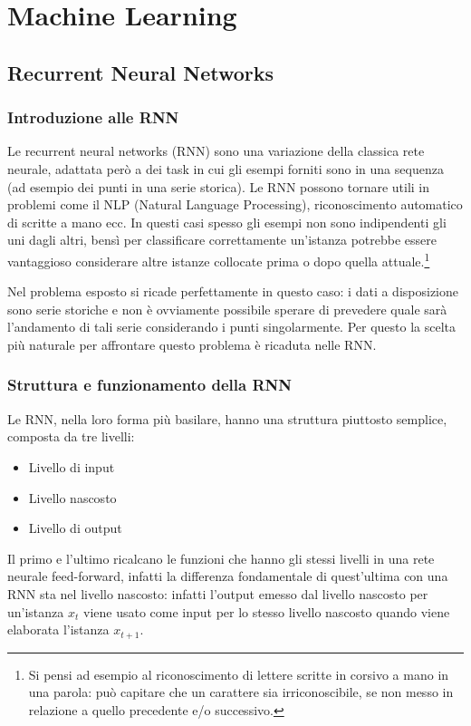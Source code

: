 \section{Machine Learning}

\subsection{Recurrent Neural Networks}

\subsubsection{Introduzione alle RNN}
Le recurrent neural networks (RNN) sono una variazione della classica rete neurale, adattata però a dei task in cui gli esempi forniti sono in una sequenza (ad esempio dei punti in una serie storica). Le RNN possono tornare utili in problemi come il NLP (Natural Language Processing), riconoscimento automatico di scritte a mano ecc. In questi casi spesso gli esempi non sono indipendenti gli uni dagli altri, bensì per classificare correttamente un'istanza potrebbe essere vantaggioso considerare altre istanze collocate prima o dopo quella attuale.\footnote{Si pensi ad esempio al riconoscimento di lettere scritte in corsivo a mano in una parola: può capitare che un carattere sia irriconoscibile, se non messo in relazione a quello precedente e/o successivo.}

Nel problema esposto si ricade perfettamente in questo caso: i dati a disposizione sono serie storiche e non è ovviamente possibile sperare di prevedere quale sarà l'andamento di tali serie considerando i punti singolarmente. Per questo la scelta più naturale per affrontare questo problema è ricaduta nelle RNN.

\subsubsection{Struttura e funzionamento della RNN}
Le RNN, nella loro forma più basilare, hanno una struttura piuttosto semplice, composta da tre livelli:
\begin{itemize}
    \item Livello di input
    \item Livello nascosto
    \item Livello di output 
\end{itemize}
Il primo e l'ultimo ricalcano le funzioni che hanno gli stessi livelli in una rete neurale feed-forward, infatti la differenza fondamentale di quest'ultima con una RNN sta nel livello nascosto: infatti l'output emesso dal livello nascosto per un'istanza $x_t$ viene usato come input per lo stesso livello nascosto quando viene elaborata l'istanza $x_{t+1}$.

